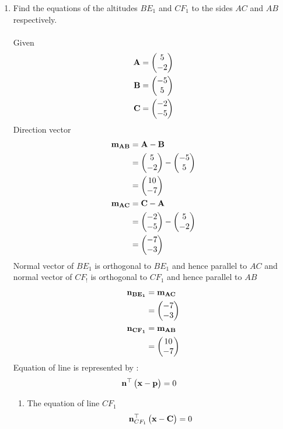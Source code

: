 \documentclass[11pt]{book}
\begin{document}
\begin{enumerate}[label=\thesection.\arabic*.,ref=\thesection.\theenumi]
\item Find the equations of the altitudes $BE_1$ and $CF_1$ to the sides $AC$ and $AB$ respectively. 
  \\    \\ \solution Given 
    \begin{align} 
 \mathbf{A} &= \begin{pmatrix} 5\\ -2 \end{pmatrix} \\ \mathbf{B} &= \begin{pmatrix} -5\\ 5 \end{pmatrix}
  \\\mathbf{C} &= \begin{pmatrix} -2\\ -5\end{pmatrix}
 \end{align}
 Direction vector 
 \begin{align}
     \mathbf{m_{AB}}&=\mathbf{A}-\mathbf{B} \\
           &=\begin{pmatrix}5 \\ -2\end{pmatrix} -\begin{pmatrix}-5 \\ 5\end{pmatrix}  \\
           &=\begin{pmatrix}10 \\ -7\end{pmatrix} \\
    \mathbf{ m_{AC}}&=\mathbf{C}-\mathbf{A} \\
     &=\begin{pmatrix}-2 \\ -5\end{pmatrix} -\begin{pmatrix}5 \\ -2\end{pmatrix}  \\
     &=\begin{pmatrix}-7 \\ -3\end{pmatrix} \\
 \end{align}
  Normal vector of $BE_1$ is orthogonal to $BE_1$  and hence parallel to $AC$ and normal vector of $CF_!$ is orthogonal to $CF_1$ and hence parallel to $AB$
  \begin{align}
      \mathbf{n_{BE_1}}&=\mathbf{m_{AC}}\\
      &=\begin{pmatrix}-7 \\ -3\end{pmatrix}\\
      \mathbf{n_{CF_1}}&=\mathbf{m_{AB}}\\
      &=\begin{pmatrix}10 \\ -7\end{pmatrix}\\
  \end{align}
  Equation of line is represented by :
  \begin{align}
      \mathbf{n}^{\top}\begin{pmatrix}\mathbf{x}-\mathbf{p}\end{pmatrix}&=0
  \end{align}
  \begin{enumerate}
      \item The equation of line $CF_1$
      \begin{align}
          \vec{n}^{\top}_{CF_1}\myvec{\vec{x}-\vec{C}}&=0 \\

\end{align}
\end{enumerate}
\end{enumerate}
\end{document}
